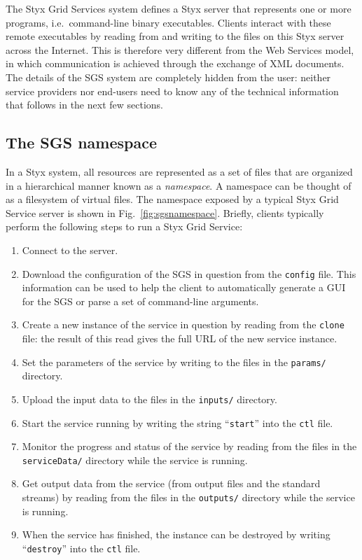 \documentclass{llncs}
\begin{document}
The Styx Grid Services system defines a Styx server that represents one or more programs, i.e.\ command-line binary executables.  Clients interact with these remote executables by reading from and writing to the files on this Styx server across the Internet.  This is therefore very different from the Web Services model, in which communication is achieved through the exchange of XML documents.  The details of the SGS system are completely hidden from the user: neither service providers nor end-users need to know any of the technical information that follows in the next few sections.

\subsection{The SGS namespace}
In a Styx system, all resources are represented as a set of files that are organized in a hierarchical manner known as a {\em namespace\/}.  A namespace can be thought of as a filesystem of virtual files.  The namespace exposed by a typical Styx Grid Service server is shown in Fig.~\ref{fig:sgsnamespace}.  Briefly, clients typically perform the following steps to run a Styx Grid Service:
\begin{enumerate}
	\item Connect to the server.
	\item Download the configuration of the SGS in question from the {\tt config} file.  This information can be used to help the client to automatically generate a GUI for the SGS or parse a set of command-line arguments.
	\item Create a new instance of the service in question by reading from the {\tt clone} file: the result of this read gives the full URL of the new service instance.
	\item Set the parameters of the service by writing to the files in the {\tt params/} directory.
	\item Upload the input data to the files in the {\tt inputs/} directory.
	\item Start the service running by writing the string ``{\tt start}'' into the {\tt ctl} file.
	\item Monitor the progress and status of the service by reading from the files in the {\tt serviceData/} directory while the service is running.
	\item Get output data from the service (from output files and the standard streams) by reading from the files in the {\tt outputs/} directory while the service is running.
	\item When the service has finished, the instance can be destroyed by writing ``{\tt destroy}'' into the {\tt ctl} file.
\end{enumerate}
\end{document}
